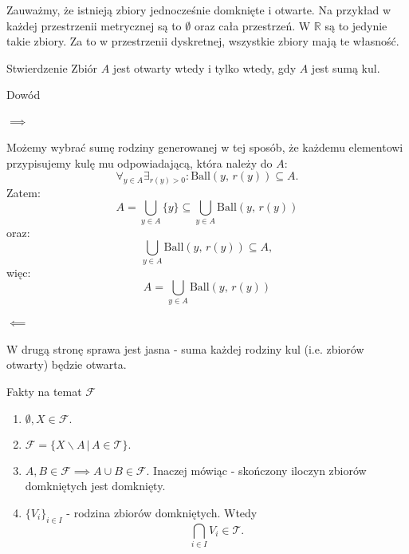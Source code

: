 \documentclass{article}
\newcommand{\R}{\mathbb{R}}
\newcommand{\Tau}{\mathcal{T}}
\newcommand{\Fau}{\mathcal{F}}
\newcommand{\ball}[2]{\text{Ball}(#1, \, #2)}
\begin{document}
     Zauważmy, że istnieją zbiory jednocześnie domknięte i otwarte. Na przykład w każdej przestrzenii metrycznej są to $\emptyset$ oraz cała przestrzeń. W $\R$ są to jedynie takie zbiory. Za to w przestrzenii dyskretnej, wszystkie zbiory mają te własność.


     \begin{twier}{Stwierdzenie}
        Zbiór $A$ jest otwarty wtedy i tylko wtedy, gdy $A$ jest sumą kul.
     \end{twier}
     \begin{dow}{Dowód} 
        \paragraph{$\implies$} Możemy wybrać sumę rodziny generowanej w tej sposób, że każdemu elementowi przypisujemy kulę mu odpowiadającą, która należy do $A$: \begin{equation}
                \forall_{y \in A} \exists_{r(y) >0}: \ball{y}{r(y)} \subseteq A.
            \end{equation} Zatem: \begin{equation}
                A = \bigcup_{y \in A} \{ y \} \subseteq \bigcup_{y \in A} \ball{y}{r(y)}
            \end{equation} oraz: \begin{equation}
                \bigcup_{y \in A} \ball{y}{r(y)} \subseteq A,
            \end{equation} więc:\begin{equation}
                A = \bigcup_{y \in A} \ball{y}{r(y)}
            \end{equation}
 
        \paragraph{$\impliedby$} W drugą stronę sprawa jest jasna - suma każdej rodziny kul (i.e. zbiorów otwarty) będzie otwarta.
     \end{dow}

    \begin{obs}{Fakty na temat $\Fau$}
        \begin{enumerate}
            \item $\emptyset, X \in \Fau.$
            \item $\Fau = \{ X \backslash A \, \big| \, A \in \Tau \}.$
            \item $A, B \in \Fau \implies A \cup B \in \Fau.$ Inaczej mówiąc - skończony iloczyn zbiorów domkniętych jest domknięty.
            \item $\{V_i\}_{i \in I}$ - rodzina zbiorów domkniętych. Wtedy \begin{equation}
                \bigcap_{i \in I} V_i \in \Tau.
            \end{equation}
        \end{enumerate}
    \end{obs}
\end{document}
